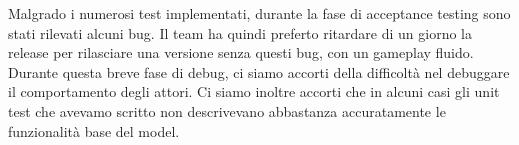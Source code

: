 Malgrado i numerosi test implementati, durante la fase di acceptance testing sono stati rilevati alcuni bug. Il team ha quindi preferto ritardare di un giorno la release per rilasciare una versione senza questi bug, con un gameplay fluido.
Durante questa breve fase di debug, ci siamo accorti della difficoltà nel debuggare il comportamento degli attori. Ci siamo inoltre accorti che in alcuni casi gli unit test che avevamo scritto non descrivevano abbastanza accuratamente le funzionalità base del model.
